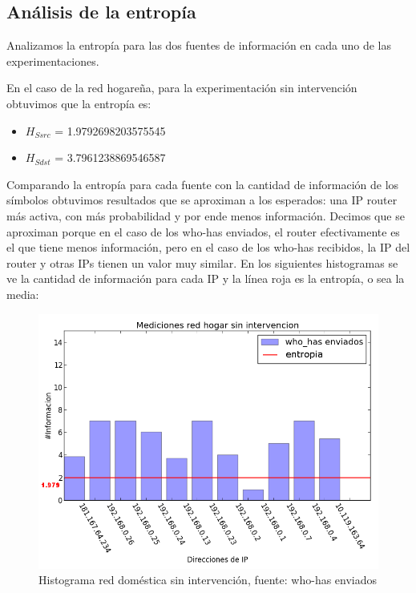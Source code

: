 \subsection{Análisis de la entropía}

Analizamos la entropía para las dos fuentes de información en cada uno de las experimentaciones.

En el caso de la red hogare\~na, para la experimentación sin intervención obtuvimos que la entropía es:
\begin{itemize}
\item $H_{Ssrc}$ = 1.9792698203575545
\item $H_{Sdst}$ = 3.7961238869546587
\end{itemize}

Comparando la entropía para cada fuente con la cantidad de información de los símbolos obtuvimos resultados que se aproximan a los esperados: una IP router más activa, con más probabilidad y por ende menos información. Decimos que se aproximan porque en el caso de los who-has enviados, el router efectivamente es el que tiene menos información, pero en el caso de los who-has recibidos, la IP del router y otras IPs tienen un valor muy similar.
En los siguientes histogramas se ve la cantidad de información para cada IP y la línea roja es la entropía, o sea la media:

\begin{figure}[!h]
	\begin{center}
		  \includegraphics[scale=0.4]{Graficos/hogar_sin_sent_who_has.png}
		  \caption{Histograma red doméstica sin intervención, fuente: who-has enviados}
		  \label{fig:contra1}
	\end{center}
\end{figure}

